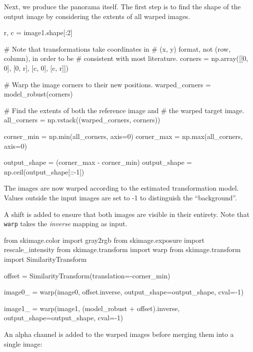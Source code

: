     Next, we produce the panorama itself. The first step is to find the shape of the output image by considering the extents of all warped images.

    \begin{pyverbatim}
      r, c = image1.shape[:2]

      # Note that transformations take coordinates in
      # (x, y) format, not (row, column), in order to be
      # consistent with most literature.
      corners = np.array([[0, 0],
                          [0, r],
                          [c, 0],
                          [c, r]])

      # Warp the image corners to their new positions.
      warped_corners = model_robust(corners)

      # Find the extents of both the reference image and
      # the warped target image.
      all_corners = np.vstack((warped_corners, corners))

      corner_min = np.min(all_corners, axis=0)
      corner_max = np.max(all_corners, axis=0)

      output_shape = (corner_max - corner_min)
      output_shape = np.ceil(output_shape[::-1])
    \end{pyverbatim}

    The images are now warped according to the estimated transformation model. Values outside the input images are set to -1 to distinguish the ``background''.

    A shift is added to ensure that both images are visible in their entirety. Note that \texttt{warp} takes the \textit{inverse} mapping as input.

    \begin{pyverbatim}
      from skimage.color import gray2rgb
      from skimage.exposure import rescale_intensity
      from skimage.transform import warp
      from skimage.transform import SimilarityTransform

      offset = SimilarityTransform(translation=-corner_min)

      image0_ = warp(image0, offset.inverse,
                     output_shape=output_shape, cval=-1)

      image1_ = warp(image1, (model_robust + offset).inverse,
                     output_shape=output_shape, cval=-1)
    \end{pyverbatim}

    An alpha channel is added to the warped images before merging them into a single image:

